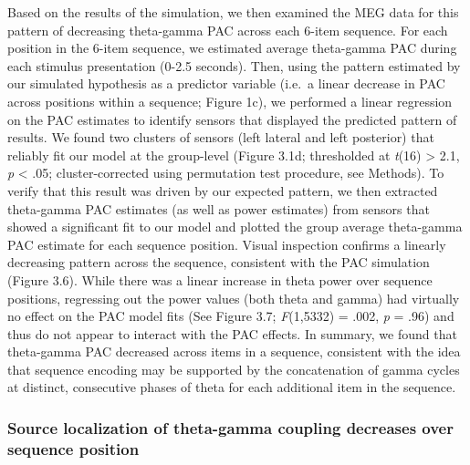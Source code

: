 Based on the results of the simulation, we then examined the MEG data
for this pattern of decreasing theta-gamma PAC across each 6-item
sequence. For each position in the 6-item sequence, we estimated average
theta-gamma PAC during each stimulus presentation (0-2.5 seconds). Then,
using the pattern estimated by our simulated hypothesis as a predictor
variable (i.e.~a linear decrease in PAC across positions within a
sequence; Figure 1c), we performed a linear regression on the PAC
estimates to identify sensors that displayed the predicted pattern of
results. We found two clusters of sensors (left lateral and left
posterior) that reliably fit our model at the group-level (Figure 3.1d;
thresholded at \emph{t}(16) \textgreater{} 2.1, \emph{p} \textless{}
.05; cluster-corrected using permutation test procedure, see Methods).
To verify that this result was driven by our expected pattern, we then
extracted theta-gamma PAC estimates (as well as power estimates) from
sensors that showed a significant fit to our model and plotted the group
average theta-gamma PAC estimate for each sequence position. Visual
inspection confirms a linearly decreasing pattern across the sequence,
consistent with the PAC simulation (Figure 3.6). While there was a
linear increase in theta power over sequence positions, regressing out
the power values (both theta and gamma) had virtually no effect on the
PAC model fits (See Figure 3.7; \emph{F}(1,5332) = .002, \emph{p} = .96)
and thus do not appear to interact with the PAC effects. In summary, we
found that theta-gamma PAC decreased across items in a sequence,
consistent with the idea that sequence encoding may be supported by the
concatenation of gamma cycles at distinct, consecutive phases of theta
for each additional item in the sequence.

\subsubsection{Source localization of theta-gamma coupling decreases
over sequence
position}\label{source-localization-of-theta-gamma-coupling-decreases-over-sequence-position}

